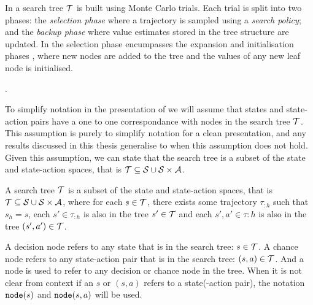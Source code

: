         In \thtspp\ewe a search tree $\mathcal{T}$ is built using Monte Carlo trials. Each trial is split into two phases: the \textit{selection phase} where a trajectory is sampled using a \textit{search policy}; and the \textit{backup phase} where value estimates stored in the tree structure are updated. In \thtspp\ewe the selection phase encumpasses the expansion and initialisation phases , where new nodes are added to the tree and the values of any new leaf node is initialised. 

        .

        To simplify notation in the presentation of \thtspp\ewe we will assume that states and state-action pairs have a one to one correspondance with nodes in the search tree $\mathcal{T}$. This assumption is purely to simplify notation for a clean presentation, and any results discussed in this thesis generalise to when this assumption does not hold. Given this assumption, we can state that the search tree is a subset of the state and state-action spaces, that is $\mathcal{T}\subseteq \mathcal{S} \cup \mathcal{S} \times \mathcal{A}$. 

        \begin{defn}
            A \textnormal{search tree} $\mathcal{T}$ is a subset of the state and state-action spaces, that is $\mathcal{T}\subseteq \mathcal{S} \cup \mathcal{S} \times \mathcal{A}$, where for each $s\in\mathcal{T}$, there exists some trajectory $\tau_{:h}$ such that $s_h = s$, each $s'\in\tau_{:h}$ is also in the tree $s'\in\mathcal{T}$ and each $s',a'\in\tau{:h}$ is also in the tree $(s',a')\in\mathcal{T}$.
        \end{defn}




        \begin{defn}
            A \textnormal{decision node} refers to any state that is in the search tree: $s\in\mathcal{T}$. A \textnormal{chance node} refers to any state-action pair that is in the search tree: $(s,a)\in\mathcal{T}$. And a \textnormal{node} is used to refer to any decision or chance node in the tree. When it is not clear from context if an $s$ or $(s,a)$ refers to a state(-action pair), the notation ${\textnormal{\texttt{node}}}(s)$ and ${\textnormal{\texttt{node}}}(s,a)$ will be used. 
        \end{defn}

